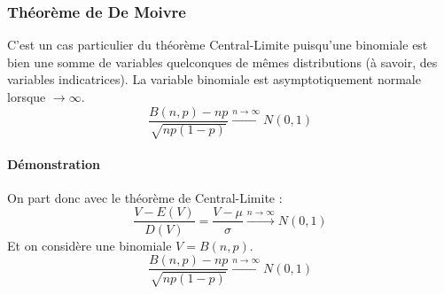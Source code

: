 \subsubsection{Théorème de De Moivre}
C'est un cas particulier du théorème Central-Limite puisqu'une binomiale est bien une somme de variables quelconques de mêmes distributions (à savoir, des variables indicatrices). La variable binomiale est asymptotiquement normale lorsque $\rightarrow\infty$.
$$\boxed{\dfrac{B(n,p)-np}{\sqrt{np(1-p)}} \stackrel{n\rightarrow\infty}{\rightarrow} N(0,1)}$$


\paragraph{Démonstration}
On part donc avec le théorème de Central-Limite :
$$\dfrac{V-E(V)}{D(V)} = \dfrac{V-\mu}{\sigma} \stackrel{n\rightarrow\infty}{\rightarrow} N(0,1)$$
Et on considère une binomiale $V = B(n,p)$.
$$\boxed{\dfrac{B(n,p)-np}{\sqrt{np(1-p)}} \stackrel{n\rightarrow\infty}{\rightarrow} N(0,1)}$$

